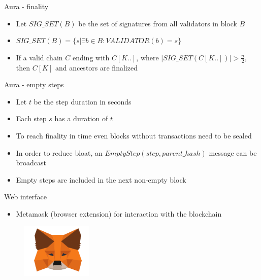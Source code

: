\documentclass[10pt]{beamer}
\begin{document}
\begin{frame}{Aura - finality}
	\begin{itemize}
		\item Let $SIG\_SET(B)$ be the set of signatures from all validators in block $B$
		\item $SIG\_SET(B) = \{s|\exists b \in B: VALIDATOR(b) = s\}$
		\item If a valid chain $C$ ending with $C[K..]$, where $|SIG\_SET(C[K..])| > \frac{n}{2}$, then $C[K]$ and ancestors are finalized
	\end{itemize}
\end{frame}

\begin{frame}{Aura - empty steps}
	\begin{itemize}
		\item Let $t$ be the step duration in seconds
		\item Each step $s$ has a duration of $t$
		\item To reach finality in time even blocks without transactions need to be sealed
		\item In order to reduce bloat, an $EmptyStep(step, parent\_hash)$ message can be broadcast
		\item Empty steps are included in the next non-empty block
	\end{itemize}
\end{frame}

\begin{frame}{Web interface}
	\begin{itemize}
		\item Metamask (browser extension) for interaction with the blockchain
	\end{itemize}
	\begin{figure}
		\includegraphics[width=0.3\textwidth]{images/mm-logo.png}
	\end{figure}
\end{frame}
\end{document}

